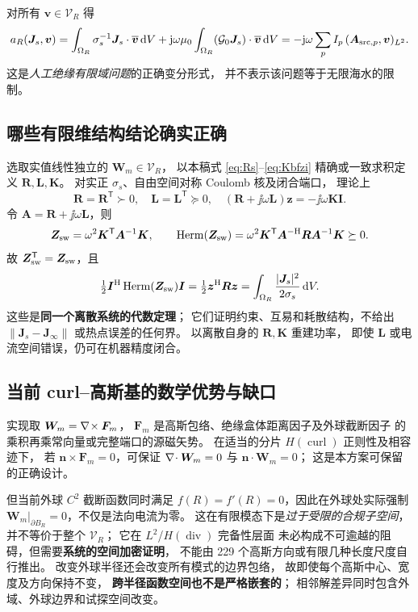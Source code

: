 对所有 \(\bm v\in\mathcal V_R\) 得
\begin{equation}
a_R(\bm J_s,\bm v)
=\int_{\Omega_R}\sigma_s^{-1}\bm J_s\cdot\overline{\bm v}\,\mathrm dV
+\mathrm j\omega\mu_0\int_{\Omega_R}
(\mathcal G_0\bm J_s)\cdot\overline{\bm v}\,\mathrm dV
=-\mathrm j\omega\sum_p I_p\,(\bm A_{{\rm src},p},\bm v)_{L^2}.
\label{eq:g1-weak-corrected}
\end{equation}
这是\emph{人工绝缘有限域问题}的正确变分形式，
并不表示该问题等于无限海水的限制。

\subsection{哪些有限维结构结论确实正确}
选取实值线性独立的 \(\bm W_m\in\mathcal V_R\)，
以本稿式 \eqref{eq:Rs}--\eqref{eq:Kbfzi}
精确或一致求积定义 \(\bm R,\bm L,\bm K\)。
对实正 \(\sigma_s\)、自由空间对称 Coulomb 核及闭合端口，
理论上
\[
\bm R=\bm R^{\mathsf T}\succ0,\quad
\bm L=\bm L^{\mathsf T}\succeq0,\quad
(\bm R+\jj\omega\bm L)\bm z=-\jj\omega\bm K\bm I.
\]
令 \(\bm A=\bm R+\jj\omega\bm L\)，则
\[
\bm Z_{\rm sw}
=\omega^2\bm K^{\mathsf T}\bm A^{-1}\bm K,\qquad
\operatorname{Herm}(\bm Z_{\rm sw})
=\omega^2\bm K^{\mathsf T}\bm A^{-\mathrm H}
\bm R\bm A^{-1}\bm K\succeq0.
\]
故 \(\bm Z_{\rm sw}^{\mathsf T}=\bm Z_{\rm sw}\)，且
\[
\tfrac12\bm I^{\mathrm H}\operatorname{Herm}(\bm Z_{\rm sw})\bm I
=\tfrac12\bm z^{\mathrm H}\bm R\bm z
=\int_{\Omega_R}\frac{|\bm J_s|^2}{2\sigma_s}\,\mathrm dV.
\]
这些是\textbf{同一个离散系统的代数定理}；
它们证明约束、互易和耗散结构，不给出
\(\|\bm J_s-\bm J_\infty\|\) 或热点误差的任何界。
以离散自身的 \(\bm R,\bm K\) 重建功率，
即使 \(\bm L\) 或电流空间错误，仍可在机器精度闭合。

\subsection{当前 curl--高斯基的数学优势与缺口}
实现取 \(\bm W_m=\nabla\!\times\bm F_m\)，
\(\bm F_m\) 是高斯包络、绝缘盒体距离因子及外球截断因子
的乘积再乘常向量或完整端口的源磁矢势。
在适当的分片 \(H(\operatorname{curl})\) 正则性及相容迹下，
若 \(\bm n\times\bm F_m=0\)，可保证
\(\nabla\!\cdot\bm W_m=0\) 与 \(\bm n\cdot\bm W_m=0\)；
这是本方案可保留的正确设计。

但当前外球 \(C^2\) 截断函数同时满足
\(f(R)=f'(R)=0\)，因此在外球处实际强制
\(\bm W_m|_{\partial B_R}=0\)，不仅是法向电流为零。
这在有限模态下是\emph{过于受限的合规子空间}，
并不等价于整个 \(\mathcal V_R\)；
它在 \(L^2\)/\(H(\operatorname{div})\) 完备性层面
未必构成不可逾越的阻碍，但需要\textbf{系统的空间加密证明}，
不能由 229 个高斯方向或有限几种长度尺度自行推出。
改变外球半径还会改变所有模式的边界包络，
故即使每个高斯中心、宽度及方向保持不变，
\textbf{跨半径函数空间也不是严格嵌套的}；
相邻解差异同时包含外域、外球边界和试探空间改变。

